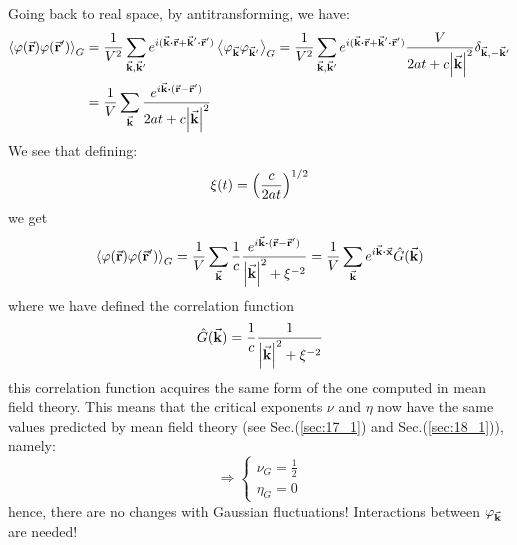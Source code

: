 \documentclass[../main/main.tex]{subfiles}
\begin{document}
Going back to real space, by antitransforming, we have:
\begin{equation*}
\begin{split}
  \expval{\varphi (\va{r}) \varphi (\va{r}')}_G &= \frac{1}{V^2} \sum_{\va{k}, \va{k}'}^{} e^{i (\va{k}\vdot \va{r} + \va{k}' \vdot \va{r}' )} \expval{\varphi _{\va{k}} \varphi _{\va{k}'}}_G
  = \frac{1}{V^2} \sum_{\va{k}, \va{k}'}^{} e^{i (\va{k}\vdot \va{r} + \va{k}' \vdot \va{r}' )}   \frac{V}{2at+c\abs{\va{k}}^2} \delta _{\va{k}, -\va{k}'} \\
  & = \frac{1}{V} \sum_{\va{k}}^{} \frac{ e^{i \va{k}\vdot ( \va{r} - \va{r}' )}}{2 a t + c \abs{\va{k}}^2}
\end{split}
\end{equation*}
We see that defining:
\begin{equation*}
  \xi  (t) = \qty(\frac{c}{2at})^{1/2}
\end{equation*}
we get
\begin{equation}
    \expval{\varphi (\va{r}) \varphi (\va{r}')}_G = \frac{1}{ V } \sum_{\va{k}}^{} \frac{1}{c} \frac{ e^{i \va{k}\vdot ( \va{r} - \va{r}' )} }{ \abs{\va{k}}^2 + \xi ^{-2}}
    = \frac{1}{V} \sum_{\va{k}}^{} e^{i \va{k} \vdot \va{x}} \hat{G} (\va{k})
\end{equation}
where we have defined the correlation function
\begin{equation}
  \hat{G} (\va{k}) = \frac{1}{c} \frac{1}{   \abs{\va{k}}^2 + \xi ^{-2} }
\end{equation}
this correlation function acquires the same form of the one computed in mean field theory. This means that the critical exponents \( \nu  \) and \( \eta  \)  now have the same values predicted by mean field theory (see Sec.(\ref{sec:17_1}) and Sec.(\ref{sec:18_1})), namely:
\begin{equation}
\Rightarrow
  \begin{cases}
   \nu _{G} = \frac{1}{2}\\
   \eta_{G} = 0
  \end{cases}
\end{equation}
hence, there are no changes with Gaussian fluctuations! Interactions between \( \varphi _{\va{k}} \) are needed!
\end{document}
